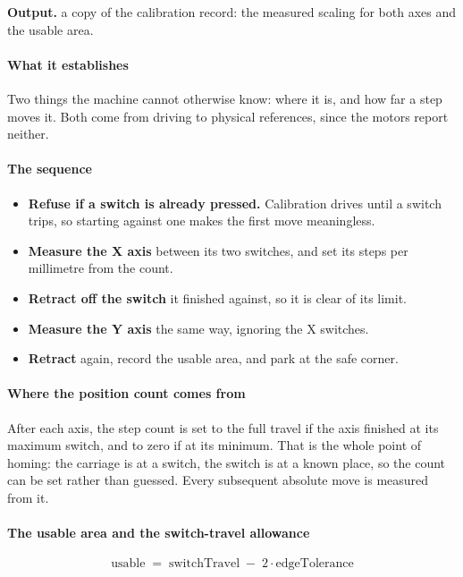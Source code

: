 \noindent\textbf{Output.} a copy of the calibration record: the measured scaling for both axes and the usable area.


\paragraph{What it establishes}
Two things the machine cannot otherwise know: where it is, and how far a step moves it. Both come from driving to physical references, since the motors report neither.


\paragraph{The sequence}

\begin{itemize}\setlength\itemsep{0pt}
  \item \textbf{Refuse if a switch is already pressed.} Calibration drives until a switch trips, so starting against one makes the first move meaningless.
  \item \textbf{Measure the X axis} between its two switches, and set its steps per millimetre from the count.
  \item \textbf{Retract off the switch} it finished against, so it is clear of its limit.
  \item \textbf{Measure the Y axis} the same way, ignoring the X switches.
  \item \textbf{Retract} again, record the usable area, and park at the safe corner.
\end{itemize}

\paragraph{Where the position count comes from}
After each axis, the step count is set to the full travel if the axis finished at its maximum switch, and to zero if at its minimum. That is the whole point of homing: the carriage is at a switch, the switch is at a known place, so the count can be set rather than guessed. Every subsequent absolute move is measured from it.


\paragraph{The usable area and the switch-travel allowance}

\begin{equation}
\mathrm{usable} \;=\; \mathrm{switchTravel} \;-\; 2 \cdot \mathrm{edgeTolerance}
\end{equation}

